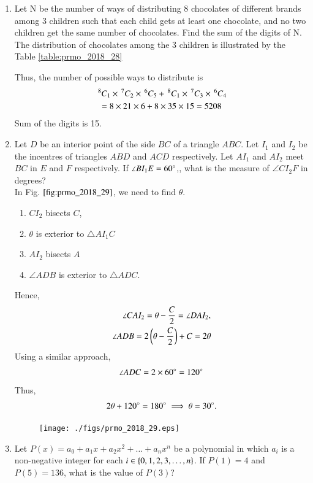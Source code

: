 \documentclass[journal,12pt,twocolumn]{IEEEtran}
\begin{document}
\begin{enumerate}[label=\arabic*]
\item Let N be the number of ways of distributing 8 chocolates of different brands among 3 children such that each child gets at least one chocolate, and no two children get the same number of chocolates. Find the sum of the digits of N.
\\
\solution The distribution of chocolates among the 3 children is illustrated by the Table \ref{table:prmo_2018_28}
\begin{table}[!ht]
\centering

\caption{}
\label{table:prmo_2018_28}
\end{table}
%
Thus, the number of possible ways to distribute is 
\begin{multline}
\,^{8}C_{1}\times
\,^{7}C_{2}\times
\,^{6}C_{5}
+
\,^{8}C_{1}\times
\,^{7}C_{3}\times
\,^{6}C_{4} 
\\
= 8\times 21\times6+8\times35\times15 = 5208 
\end{multline}
%
Sum of the digits is 15.
\item Let $D$ be an interior point of the side $BC$ of a triangle $ABC$. Let $I_1$ and $I_2$ be the incentres of triangles $ABD$ and $ACD$ respectively. Let $AI_1$ and $AI_2$ meet $BC$ in $E$ and $F$ respectively. If $\angle BI_1E = 60 \degree$,, what is the measure of $\angle CI_2F$ in degrees?
\\
\solution In Fig. $\ref{fig:prmo_2018_29}$, we need to find $\theta$.  
\begin{enumerate}
\item $CI_2$ bisects $C$,  
\item $\theta$ is exterior to $\triangle AI_1 C$
\item $AI_2$ bisects $A$
\item $\angle ADB$ is exterior to $\triangle ADC$.
\end{enumerate}
Hence,
\begin{align}
\angle CAI_2 = \theta -\frac{C}{2} = \angle DAI_2,
\\
\angle ADB = 2\left(\theta -\frac{C}{2}\right) + C = 2\theta
\end{align}
%
Using a similar approach, 
\begin{align}
\angle ADC = 2\times 60 \degree = 120 \degree
\end{align}
Thus, 
\begin{align}
2\theta + 120 \degree = 180 \degree \implies \theta = 30 \degree.
\end{align}
\begin{figure}[!ht]
\centering
\texttt{[image: ./figs/prmo\_2018\_29.eps]}
\caption{}
\label{fig:prmo_2018_29}
\end{figure}
\item Let $P(x)= a_0 + a_1x+ a_2x^2 + \dots + a_nx^n$ be a polynomial in which $a_i$ is a non-negative integer for each $i \in \left\{0, 1, 2, 3, \dots ,n\right\}$. If $P(1) = 4$ and $P(5) = 136$, what is the value of $P(3)$?

\end{enumerate}
\end{document}
